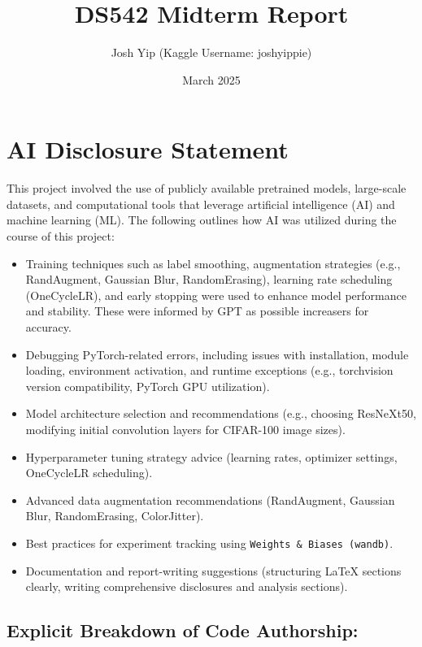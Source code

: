 \documentclass{article}
\title{DS542 Midterm Report}
\author{Josh Yip (Kaggle Username: joshyippie)}
\date{March 2025}
\begin{document}
\maketitle

\section*{AI Disclosure Statement}

This project involved the use of publicly available pretrained models, large-scale datasets, and computational tools that leverage artificial intelligence (AI) and machine learning (ML). The following outlines how AI was utilized during the course of this project:

\begin{itemize}
    \item Training techniques such as label smoothing, augmentation strategies (e.g., RandAugment, Gaussian Blur, RandomErasing), learning rate scheduling (OneCycleLR), and early stopping were used to enhance model performance and stability. These were informed by GPT as possible increasers for accuracy.

        \item Debugging PyTorch-related errors, including issues with installation, module loading, environment activation, and runtime exceptions (e.g., torchvision version compatibility, PyTorch GPU utilization).
        \item Model architecture selection and recommendations (e.g., choosing ResNeXt50, modifying initial convolution layers for CIFAR-100 image sizes).
        \item Hyperparameter tuning strategy advice (learning rates, optimizer settings, OneCycleLR scheduling).
        \item Advanced data augmentation recommendations (RandAugment, Gaussian Blur, RandomErasing, ColorJitter).
        \item Best practices for experiment tracking using \texttt{Weights \& Biases (wandb)}.
        \item Documentation and report-writing suggestions (structuring LaTeX sections clearly, writing comprehensive disclosures and analysis sections).
    \end{itemize}

\subsection*{Explicit Breakdown of Code Authorship:}
\end{document}
